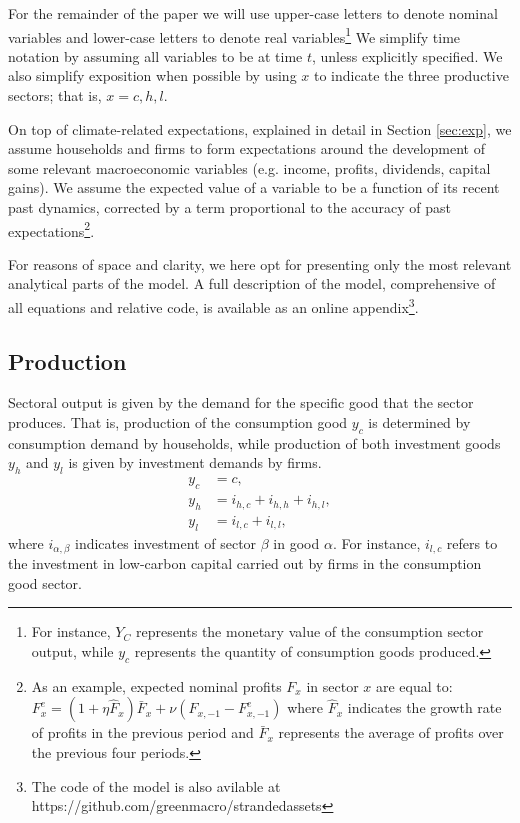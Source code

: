 \documentclass[authoryear]{article}
\begin{document}
For the remainder of the paper we will use upper-case letters to denote nominal variables and lower-case letters to denote real variables\footnote{For instance, $Y_C$ represents the monetary value of the consumption sector output, while $y_c$ represents the quantity of consumption goods produced.} We simplify time notation by assuming all variables to be at time $t$, unless explicitly specified. We also simplify exposition when possible by using $x$ to indicate the three productive sectors; that is, $x=c,h,l$.

On top of climate-related expectations, explained in detail in Section \ref{sec:exp}, we assume households and firms to form expectations around the development of some relevant macroeconomic variables (e.g. income, profits, dividends, capital gains). We assume the expected value of a variable to be a function of its recent past dynamics, corrected by a term proportional to the accuracy of past expectations\footnote{As an example, expected nominal profits $F_x$ in sector $x$ are equal to:
$F_x^e = \left(1 + \eta\hat{F}_x\right)\bar{F}_x + \nu\left(F_{x,-1} - F^e_{x,-1}\right) \label{eq:expect}$
where $\hat{F}_x$ indicates the growth rate of profits in the previous period and $\bar{F}_x$ represents the average of profits over the previous four periods.}.

For reasons of space and clarity, we here opt for presenting only the most relevant analytical parts of the model. A full description of the model, comprehensive of all equations and relative code, is available as an online appendix\footnote{The code of the model is also avilable at https://github.com/greenmacro/strandedassets}.


\subsection{Production}
\label{sec:output}

Sectoral output is given by the demand for the specific good that the sector produces. That is, production of the consumption good $y_c$ is determined by consumption demand by households, while production of both investment goods $y_h$ and $y_l$ is given by investment demands by firms.
\begin{align}
y_c&=c,  \\
y_h&=i_{h,c}+i_{h,h}+i_{h,l}, \\
y_l&=i_{l,c}+i_{l,l},
\end{align}
where $i_{\alpha,\beta}$ indicates investment of sector $\beta$ in good $\alpha$. For instance, $i_{l,c}$ refers to the investment in low-carbon capital carried out by firms in the consumption good sector. 
\end{document}
